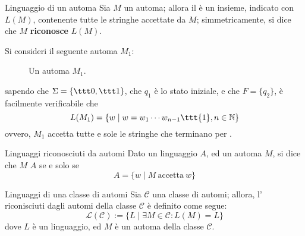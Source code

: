 \documentclass[a4paper, 12pt]{report}
\begin{document}
    \begin{frameddefn}[label={def L(M)}]{Linguaggio di un automa}
        Sia $M$ un automa; allora il  è un insieme, indicato con $L(M)$, contenente tutte le stringhe accettate da $M$; simmetricamente, si dice che $M$ \textbf{riconosce} $L(M)$.
    \end{frameddefn}

    \begin{example}
        Si consideri il seguente automa $M_1$:

        \begin{figure}[H]
            \centering
             \caption{Un automa $M_1$.}
        \end{figure}

        sapendo che $\Sigma = \{\ttt 0, \ttt 1\}$, che $q_1$ è lo stato iniziale, e che $F = \{q_2\}$, è facilmente verificabile che $$L(M_1) = \{w \mid w = w_1  \cdots w_{n - 1} \ttt{1}, n \in \mathbb{N}\}$$ ovvero, $M_1$ accetta tutte e sole le stringhe che terminano per .
    \end{example}

    \begin{frameddefn}{Linguaggi riconosciuti da automi}
        Dato un linguaggio $A$, ed un automa $M$, si dice che $M$  $A$ se e solo se $$A = \{w \mid M \ \mathrm{accetta} \ w\}$$
    \end{frameddefn}

    \begin{frameddefn}[label={ling automata}]{Linguaggi di una classe di automi}
        Sia $\mathcal{C}$ una classe di automi; allora, l' riconisciuti dagli automi della classe $\mathcal{C}$ è definito come segue: $$\mathcal L(\mathcal{C}) := \{L \mid \exists M \in \mathcal{C} : L(M) = L\}$$ dove $L$ è un linguaggio, ed $M$ è un automa della classe $\mathcal{C}$.
    \end{frameddefn}
\end{document}
